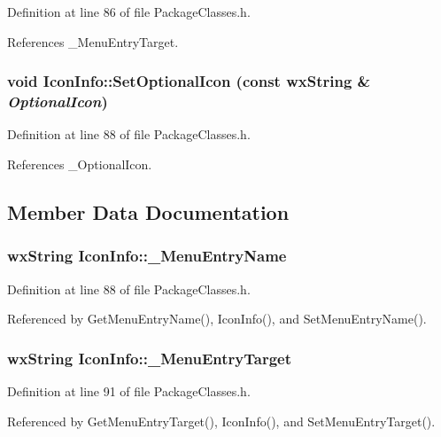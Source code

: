 Definition at line 86 of file Package\-Classes.h.

References \_\-Menu\-Entry\-Target.
\subsubsection{\setlength{\rightskip}{0pt plus 5cm}void Icon\-Info::Set\-Optional\-Icon (const wx\-String \& {\em Optional\-Icon})\hspace{0.3cm}{\tt  [inline]}}\label{class_icon_info_48fc9a7e4012286bbba5ca2bf4e99bfa}




Definition at line 88 of file Package\-Classes.h.

References \_\-Optional\-Icon.

\subsection{Member Data Documentation}
\subsubsection{\setlength{\rightskip}{0pt plus 5cm}wx\-String {\bf Icon\-Info::\_\-Menu\-Entry\-Name}\hspace{0.3cm}{\tt  [private]}}\label{class_icon_info_c81b1e5cc0d559943523068db823b7a5}




Definition at line 88 of file Package\-Classes.h.

Referenced by Get\-Menu\-Entry\-Name(), Icon\-Info(), and Set\-Menu\-Entry\-Name().
\subsubsection{\setlength{\rightskip}{0pt plus 5cm}wx\-String {\bf Icon\-Info::\_\-Menu\-Entry\-Target}\hspace{0.3cm}{\tt  [private]}}\label{class_icon_info_742a6f880ba0637f00ab19988fb2f19d}




Definition at line 91 of file Package\-Classes.h.

Referenced by Get\-Menu\-Entry\-Target(), Icon\-Info(), and Set\-Menu\-Entry\-Target().

